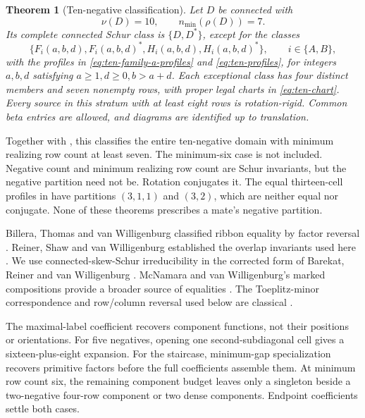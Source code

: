 \documentclass[11pt,a4paper]{amsart}
\numberwithin{equation}{section}
\theoremstyle{plain}
\newtheorem{theorem}{Theorem}[section]
\theoremstyle{definition}
\begin{document}
\begin{theorem}[Ten-negative classification]\label{thm:ten-negative-classification}
Let \(D\) be connected with
\[
 \nu(D)=10,\qquad n_{\min}(\rho(D))=7.
\]
Its complete connected Schur class is \(\{D,D^*\}\), except for the
classes
\[
 \{F_i(a,b,d),F_i(a,b,d)^*,H_i(a,b,d),H_i(a,b,d)^*\},
 \qquad i\in\{A,B\},
\]
with the profiles in \eqref{eq:ten-family-a-profiles} and
\eqref{eq:ten-profiles}, for integers \(a,b,d\) satisfying
\(a\ge1,d\ge0,b>a+d\).
Each exceptional class has four distinct members and seven nonempty rows,
with proper legal charts in \eqref{eq:ten-chart}.
Every source in this stratum with at least eight rows is rotation-rigid.
Common beta entries are allowed, and diagrams are identified up to translation.
\end{theorem}

Together with , this classifies the
entire ten-negative domain with minimum realizing row count at least seven.
The minimum-six case is not included.
Negative count and minimum realizing row count are Schur invariants, but
the negative partition need not be.  Rotation conjugates it.  The equal
thirteen-cell profiles in  have partitions
\((3,1,1)\) and \((3,2)\), which are neither equal nor conjugate.
None of these theorems prescribes a mate's negative partition.

Billera, Thomas and van Willigenburg classified ribbon equality by factor
reversal \cite{Billera2006DecomposableCompositions}.  Reiner, Shaw and
van Willigenburg established the overlap invariants used here
\cite{Reiner2007Coincidences}.  We use connected-skew-Schur irreducibility
in the corrected form of Barekat, Reiner and van Willigenburg
\cite{Barekat2009CoincidencesCorrigendum}.
McNamara and van Willigenburg's marked compositions provide a broader
source of equalities \cite{McNamara2009Classification}.  The Toeplitz-minor correspondence and row/column
reversal used below are classical \cite{GarciaGarcia2020ToeplitzMinors}.

The maximal-label coefficient recovers component functions, not their
positions or orientations.
For five negatives, opening one second-subdiagonal cell gives a
sixteen-plus-eight expansion.  For the staircase, minimum-gap
specialization recovers primitive factors before the full coefficients
assemble them.  At minimum row count six, the remaining component budget
leaves only a singleton beside a two-negative four-row component or two
dense components.  Endpoint coefficients settle both cases.
\end{document}
